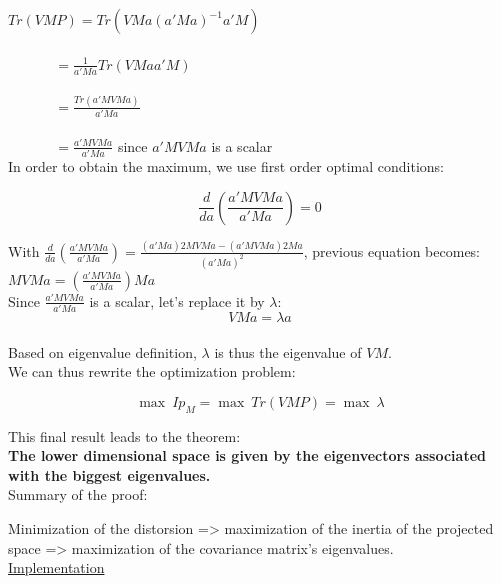 $Tr(VMP) = Tr(VMa(a'Ma)^{-1}a'M)$ \\ \\
$~~~~~~~~~~~~~~~= \frac{1}{a'Ma}Tr(VMaa'M)$ \\ \\
$~~~~~~~~~~~~~~~= \frac{Tr(a'MVMa)}{a'Ma}$ \\ \\
$~~~~~~~~~~~~~~~= \frac{a'MVMa}{a'Ma}$ since $a'MVMa$ is a scalar \\

In order to obtain the maximum, we use first order optimal conditions:

$$\frac{d}{da}(\frac{a'MVMa}{a'Ma}) = 0$$

With $\frac{d}{da}(\frac{a'MVMa}{a'Ma}) = \frac{(a'Ma)2MVMa-(a'MVMa)2Ma}{(a'Ma)^2}$, previous equation becomes: \\

$MVMa = (\frac{a'MVMa}{a'Ma})Ma$ \\

Since $\frac{a'MVMa}{a'Ma}$ is a scalar, let's replace it by $\lambda$: \\

$$VMa = \lambda a$$ \\

Based on eigenvalue definition, $\lambda$ is thus the eigenvalue of $VM$. \\

We can thus rewrite the optimization problem:

$$\max~Ip_M = \max~Tr(VMP) = \max~\lambda$$

This final result leads to the theorem: \\

\textbf{The lower dimensional space is given by the eigenvectors associated with the biggest eigenvalues.} \\

Summary of the proof:

Minimization of the distorsion => maximization of the inertia of the projected space => maximization of the covariance matrix's eigenvalues. \\

\underline{Implementation} \\

